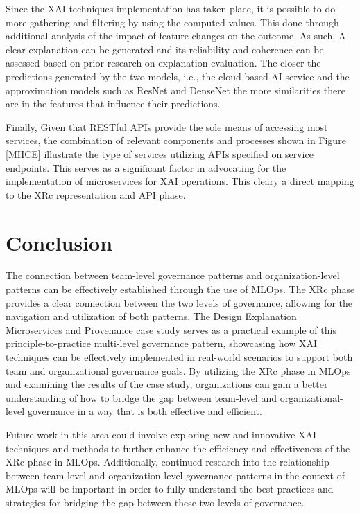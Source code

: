 \documentclass[conference]{IEEEtran}
\begin{document}
Since the XAI techniques implementation has taken place, it is possible to do more gathering and filtering by using the computed values. This done through additional analysis of the impact of feature changes on the outcome. As such, A clear explanation can be generated and its reliability and coherence can be assessed based on prior research on explanation evaluation. The closer the predictions generated by the two models, i.e., the cloud-based AI service and the approximation models such as ResNet and DenseNet the more similarities there are in the features that influence their predictions.

Finally, Given that RESTful APIs provide the sole means of accessing most services, the combination of relevant components and processes shown in Figure \ref{MIICE} illustrate the type of services utilizing APIs specified on service endpoints. This serves as a significant factor in advocating for the implementation of microservices for XAI operations. This cleary a direct mapping to the XRc representation and API phase.

\section{Conclusion}
The connection between team-level governance patterns and organization-level patterns can be effectively established through the use of MLOps. The XRc phase provides a clear connection between the two levels of governance, allowing for the navigation and utilization of both patterns. The Design Explanation Microservices and Provenance case study serves as a practical example of this principle-to-practice multi-level governance pattern, showcasing how XAI techniques can be effectively implemented in real-world scenarios to support both team and organizational governance goals. By utilizing the XRc phase in MLOps and examining the results of the case study, organizations can gain a better understanding of how to bridge the gap between team-level and organizational-level governance in a way that is both effective and efficient.

Future work in this area could involve exploring new and innovative XAI techniques and methods to further enhance the efficiency and effectiveness of the XRc phase in MLOps. Additionally, continued research into the relationship between team-level and organization-level governance patterns in the context of MLOps will be important in order to fully understand the best practices and strategies for bridging the gap between these two levels of governance.



\end{document}
